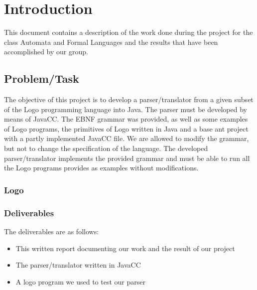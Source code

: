 \chapter{Introduction}
\label{chap:introduction}

This document contains a description of the work done during the project for the class Automata and Formal Languages and the results that have been accomplished by our group.

\section{Problem/Task}
\label{sec:problem_task}

The objective of this project is to develop a parser/translator from a given subset of the Logo programming language into Java. The parser must be developed by means of JavaCC. The EBNF grammar was provided, as well as some examples of Logo programs, the primitives of Logo written in Java and a base ant project with a partly implemented JavaCC file. We are allowed to modify the grammar, but not to change the specification of the language. The developed parser/translator implements the provided grammar and must be able to run all the Logo programs provides as examples without modifications.

\subsection{Logo}
\label{sec:logo}

\subsection{Deliverables}
\label{sec:deliverables}

The deliverables are as follows:

\begin{itemize}
\item This written report documenting our work and the result of our project
\item The parser/translator written in JavaCC
\item A logo program we used to test our parser
\end{itemize}


\newpage
